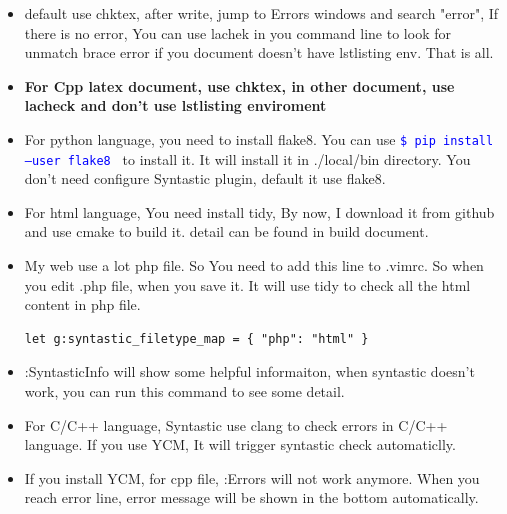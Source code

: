 \documentclass[a4paper,11pt,twoside]{book}
\newcommand{\linuxcommand}[1]{\texttt{\textcolor{blue}{\$ #1 \Pisymbol{psy}{191}}}}
\begin{document}
\begin{itemize}
		\item default use chktex, after write, jump to Errors windows and search "error", If there is no error, You can use lachek in you command line to look for unmatch brace error if you document doesn't have lstlisting env. That is all.

		\item \textbf{For Cpp latex document, use chktex, in other document, use lacheck and don't use lstlisting enviroment}

		\item For python language, you need to install flake8. You can use \linuxcommand{pip install --user flake8} to install it. It will install it in ./local/bin directory. You don't need configure Syntastic plugin, default it use flake8.

		\item For html language, You need install tidy, By now, I download it from github and use cmake to build it. detail can be found in build document. 

		\item My web use a lot php file. So You need to add this line to .vimrc. So when you edit .php file, when you save it. It will use tidy to check all the html content in php file.
\begin{verbatim}
let g:syntastic_filetype_map = { "php": "html" }
\end{verbatim}

		\item :SyntasticInfo will show some helpful informaiton, when syntastic doesn't work, you can run this command to see some detail. 

		\item For C/C++ language, Syntastic use clang to check errors in C/C++ language. If you use YCM, It will trigger syntastic check automaticlly.

		\item If you install YCM, for cpp file, :Errors will not work anymore. When you reach error line, error message will be shown in the bottom automatically. 

\end{itemize}
\end{document}
